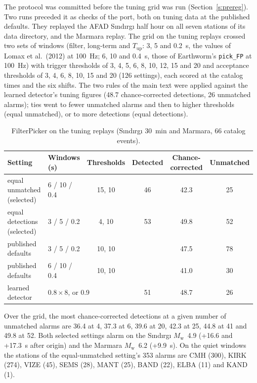 \documentclass[11pt,a4paper]{article}
\newcommand{\Mw}{$M_\mathrm{w}$}
\begin{document}
The protocol was committed before the tuning grid was run (Section~\ref{s:prereg}).
Two runs preceded it as checks of the port, both on tuning data at the published defaults. They replayed the AFAD S\i{}nd\i{}rg\i{} half hour on all seven stations of its data directory, and the Marmara replay. The grid on the tuning replays crossed two sets
of windows (filter, long-term and $T_\mathrm{up}$: 3, 5 and 0.2~s, the values of
  Lomax et al.\ (2012) at 100~Hz; 6, 10 and 0.4~s, those of Earthworm's
\texttt{pick\_FP} at 100~Hz) with trigger thresholds of 3, 4, 5, 6, 8, 10, 12, 15
and 20 and acceptance thresholds of 3, 4, 6, 8, 10, 15 and 20 (126 settings), each
scored at the catalog times and the six shifts. The two rules of the main text
were applied against the learned detector's tuning figures (48.7 chance-corrected
detections, 26 unmatched alarms); ties went to fewer unmatched alarms and then to
higher thresholds (equal unmatched), or to more detections (equal detections).

\begin{table}[htbp]
  \centering\footnotesize\setlength{\tabcolsep}{4pt}
  \caption{FilterPicker on the tuning replays (S\i{}nd\i{}rg\i{} 30~min and Marmara,
  66 catalog events).}\label{t:filterpicker}
  \begin{tabular}{@{}llcccc@{}}
    \toprule
    Setting & Windows (s) & Thresholds & Detected & Chance-corrected & Unmatched \\
    \midrule
    equal unmatched (selected)  & 6 / 10 / 0.4 & 15, 10 & 46 & 42.3 & 25 \\
    equal detections (selected) & 3 / 5 / 0.2  & 4, 10  & 53 & 49.8 & 52 \\
    published defaults          & 3 / 5 / 0.2  & 10, 10 &    & 47.5 & 78 \\
    published defaults          & 6 / 10 / 0.4 & 10, 10 &    & 41.0 & 30 \\
    \addlinespace
    learned detector            & \multicolumn{2}{l}{$0.8 \times 8$, or 0.9} & 51 & 48.7 & 26 \\
    \bottomrule
  \end{tabular}
\end{table}

\noindent Over the grid, the most chance-corrected detections at a given number of
unmatched alarms are 36.4 at 4, 37.3 at 6, 39.6 at 20, 42.3 at 25, 44.8 at 41 and
49.8 at 52. Both selected settings alarm on the S\i{}nd\i{}rg\i{} \Mw{}~4.9 (+16.6
and +17.3~s after origin) and the Marmara \Mw{}~6.2 (+9.9~s). On the quiet windows
the stations of the equal-unmatched setting's 353 alarms are CMH (300), KIRK
(274), VIZE (45), SEMS (28), MANT (25), BAND (22), ELBA (11) and KAND (1).
\end{document}

